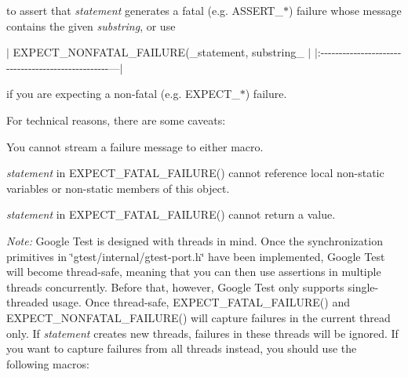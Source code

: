 to assert that {\itshape statement} generates a fatal (e.\+g. {\ttfamily A\+S\+S\+E\+R\+T\+\_\+$\ast$}) failure whose message contains the given {\itshape substring}, or use

$\vert$ {\ttfamily E\+X\+P\+E\+C\+T\+\_\+\+N\+O\+N\+F\+A\+T\+A\+L\+\_\+\+F\+A\+I\+L\+U\+RE(}\+\_\+statement, substring\+\_\+{\ttfamily );} $\vert$ $\vert$\+:-\/-\/-\/-\/-\/-\/-\/-\/-\/-\/-\/-\/-\/-\/-\/-\/-\/-\/-\/-\/-\/-\/-\/-\/-\/-\/-\/-\/-\/-\/-\/-\/-\/-\/-\/-\/-\/-\/-\/-\/-\/-\/-\/-\/-\/-\/-\/-\/-\/-\/---$\vert$

if you are expecting a non-\/fatal (e.\+g. {\ttfamily E\+X\+P\+E\+C\+T\+\_\+$\ast$}) failure.

For technical reasons, there are some caveats\+:


\begin{DoxyEnumerate}
\item You cannot stream a failure message to either macro.
\end{DoxyEnumerate}
\begin{DoxyEnumerate}
\item {\itshape statement} in {\ttfamily E\+X\+P\+E\+C\+T\+\_\+\+F\+A\+T\+A\+L\+\_\+\+F\+A\+I\+L\+U\+R\+E()} cannot reference local non-\/static variables or non-\/static members of {\ttfamily this} object.
\end{DoxyEnumerate}
\begin{DoxyEnumerate}
\item {\itshape statement} in {\ttfamily E\+X\+P\+E\+C\+T\+\_\+\+F\+A\+T\+A\+L\+\_\+\+F\+A\+I\+L\+U\+R\+E()} cannot return a value.
\end{DoxyEnumerate}

{\itshape Note\+:} Google Test is designed with threads in mind. Once the synchronization primitives in {\ttfamily \char`\"{}gtest/internal/gtest-\/port.\+h\char`\"{}} have been implemented, Google Test will become thread-\/safe, meaning that you can then use assertions in multiple threads concurrently. Before that, however, Google Test only supports single-\/threaded usage. Once thread-\/safe, {\ttfamily E\+X\+P\+E\+C\+T\+\_\+\+F\+A\+T\+A\+L\+\_\+\+F\+A\+I\+L\+U\+R\+E()} and {\ttfamily E\+X\+P\+E\+C\+T\+\_\+\+N\+O\+N\+F\+A\+T\+A\+L\+\_\+\+F\+A\+I\+L\+U\+R\+E()} will capture failures in the current thread only. If {\itshape statement} creates new threads, failures in these threads will be ignored. If you want to capture failures from all threads instead, you should use the following macros\+:

